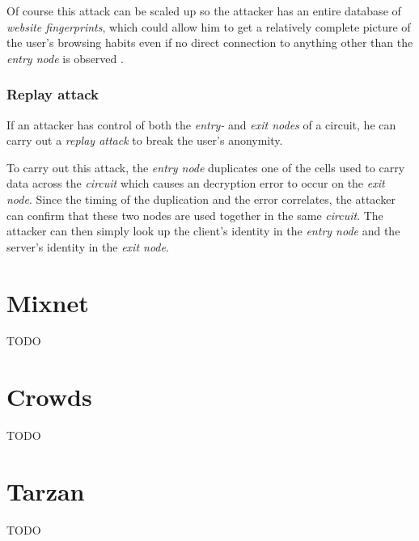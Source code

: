 \documentclass{sig-alternate}
\begin{document}
Of course this attack can be scaled up so the attacker has an entire database of \emph{website
fingerprints}, which could allow him to get a relatively complete picture of the user's browsing
habits even if no direct connection to anything other than the \emph{entry node} is observed
\cite{panchenko2011}.

\subsubsection{Replay attack}
If an attacker has control of both the \emph{entry-} and \emph{exit nodes} of a circuit, he
can carry out a \emph{replay attack}\cite{pries2007} to break the user's anonymity.

To carry out this attack, the \emph{entry node} duplicates one of the cells used to carry data
across the \emph{circuit} which causes an decryption error to occur on the \emph{exit node}.
Since the timing of the duplication and the error correlates, the attacker can confirm that
these two nodes are used together in the same \emph{circuit}. The attacker can then simply
look up the client's identity in the \emph{entry node} and the server's identity in the
\emph{exit node}.

\section{Mixnet}
TODO


\section{Crowds}
TODO

\section{Tarzan}
TODO




%
\end{document}

